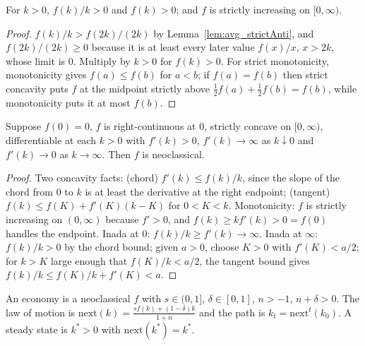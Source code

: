 \begin{lemma}
\label{lem:neoclassical_pos}
\leanok
{}
For $k > 0$, $f(k)/k > 0$ and $f(k) > 0$; and $f$ is strictly increasing on $[0, \infty)$.
\end{lemma}
\begin{proof}
\leanok
$f(k)/k > f(2k)/(2k)$ by Lemma~\ref{lem:avg_strictAnti}, and $f(2k)/(2k) \ge 0$ because it is at least
every later value $f(x)/x$, $x > 2k$, whose limit is $0$. Multiply by $k > 0$ for $f(k) > 0$.
For strict monotonicity, monotonicity gives $f(a) \le f(b)$ for $a < b$; if $f(a) = f(b)$ then strict
concavity puts $f$ at the midpoint strictly above $\tfrac12 f(a) + \tfrac12 f(b) = f(b)$, while
monotonicity puts it at most $f(b)$.
\end{proof}

\begin{theorem}
\label{thm:neoclassical_of_deriv}
\leanok
{}
Suppose $f(0) = 0$, $f$ is right-continuous at $0$, strictly concave on $[0, \infty)$, differentiable at
each $k > 0$ with $f'(k) > 0$, $f'(k) \to \infty$ as $k \downarrow 0$ and $f'(k) \to 0$ as $k \to \infty$.
Then $f$ is neoclassical.
\end{theorem}
\begin{proof}
\leanok
Two concavity facts: (chord) $f'(k) \le f(k)/k$, since the slope of the chord from $0$ to $k$ is at least
the derivative at the right endpoint; (tangent) $f(k) \le f(K) + f'(K)(k - K)$ for $0 < K < k$.
Monotonicity: $f$ is strictly increasing on $(0, \infty)$ because $f' > 0$, and $f(k) \ge k f'(k) > 0 = f(0)$
handles the endpoint. Inada at $0$: $f(k)/k \ge f'(k) \to \infty$. Inada at $\infty$: $f(k)/k > 0$ by the
chord bound; given $a > 0$, choose $K > 0$ with $f'(K) < a/2$; for $k > K$ large enough that $f(K)/k < a/2$,
the tangent bound gives $f(k)/k \le f(K)/k + f'(K) < a$.
\end{proof}

\begin{definition}
\label{def:solow_economy}
\leanok
{}
An economy is a neoclassical $f$ with $s \in (0, 1]$, $\delta \in [0, 1]$, $n > -1$, $n + \delta > 0$.
The law of motion is $\mathrm{next}(k) = \frac{s f(k) + (1 - \delta) k}{1 + n}$ and the path is
$k_t = \mathrm{next}^t(k_0)$. A steady state is $k^* > 0$ with $\mathrm{next}(k^*) = k^*$.
\end{definition}

